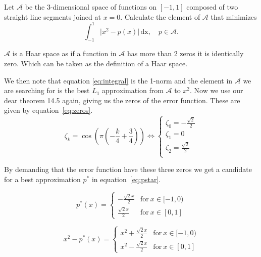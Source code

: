 \begin{problem}
  Let $\mathcal{A}$ be the 3-dimensional space of functions on
  $[-1,1]$ composed of two straight line segments joined at $x =
  0$. Calculate the element of $\mathcal{A}$ that minimizes
  \begin{equation}
    \label{eq:integral}
\int_{-1}^1 \lvert x^2 - p(x) \rvert \, \text{dx}, \quad p \in \mathcal{A}.
\end{equation}
\end{problem}


\begin{solution}
$\mathcal{A}$ is a Haar space as if a function in $\mathcal{A}$ has
more than 2 zeros it is identically zero. Which can be taken as the
definition of a Haar space.

We then note that equation \ref{eq:integral} is the 1-norm and the
element in $\mathcal{A}$ we are searching for is the best $L_1$
approximation from $\mathcal{A}$ to $x^2$. Now we use our dear theorem
14.5 again, giving us the zeros of the error function. These are given
by equation~\ref{eq:zeros}.
\begin{equation}
  \label{eq:zeros}
\zeta_k = \cos{\left (\pi \left(- \frac{k}{4} + \frac{3}{4}\right)
  \right )}
  \Leftrightarrow
  \begin{cases}
    \zeta_0 = - \frac{\sqrt{2}}{2} \\
    \zeta_1 = 0 \\
    \zeta_2 = \frac{\sqrt{2}}{2} \\
  \end{cases}
\end{equation}

By demanding that the error function have these three zeros we get a
candidate for a best approximation $p^*$ in
equation~\ref{eq:pstar}.

\begin{equation}
  \label{eq:pstar}
  p^*(x)  = 
  \begin{cases}
    - \frac{\sqrt{2} x}{2} & \text{for}\: x \in [-1, 0) \\
    \frac{\sqrt{2} x }{2} & \text{for}\: x \in [0, 1]    
  \end{cases}
\end{equation}

\begin{equation}
  \label{eq:task_4:error}
  x^2 - p^*(x)  = 
  \begin{cases}
    x^{2} + \frac{\sqrt{2} x}{2} & \text{for}\: x \in [-1, 0) \\
    x^{2} - \frac{\sqrt{2} x}{2} & \text{for}\: x \in [0, 1]
  \end{cases}
\end{equation}


\end{solution}
